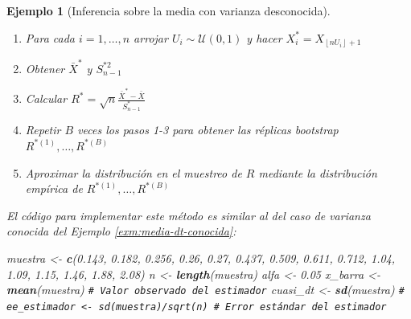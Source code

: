 \documentclass[
]{book}
\newenvironment{Shaded}{\begin{snugshade}}{\end{snugshade}}
\newcommand{\CommentTok}[1]{\textcolor[rgb]{0.56,0.35,0.01}{\textit{#1}}}
\newcommand{\FloatTok}[1]{\textcolor[rgb]{0.00,0.00,0.81}{#1}}
\newcommand{\FunctionTok}[1]{\textcolor[rgb]{0.13,0.29,0.53}{\textbf{#1}}}
\newcommand{\NormalTok}[1]{#1}
\newcommand{\OtherTok}[1]{\textcolor[rgb]{0.56,0.35,0.01}{#1}}
\theoremstyle{break}
\newtheorem{example}{Ejemplo}[chapter]
\theoremstyle{nonumberplain}
\renewcommand{\CommentTok}[1]{\textcolor[rgb]{0.41,0.41,0.41}{\texttt{#1}}}
\begin{document}
\begin{example}[Inferencia sobre la media con varianza desconocida]
\begin{enumerate}
\def\labelenumi{\arabic{enumi}.}
\item
  Para cada \(i=1,\ldots ,n\) arrojar \(U_i\sim \mathcal{U}\left( 0,1 \right)\) y
  hacer \(X_i^{\ast}=X_{\left\lfloor nU_i\right\rfloor +1}\)
\item
  Obtener \(\bar{X}^{\ast}\) y \(S_{n-1}^{\ast 2}\)
\item
  Calcular
  \(R^{\ast}=\sqrt{n}\frac{\bar{X}^{\ast}-\bar{X}}{
  S_{n-1}^{\ast}}\)
\item
  Repetir \(B\) veces los pasos 1-3 para obtener las réplicas bootstrap
  \(R^{\ast (1)}, \ldots, R^{\ast (B)}\)
\item
  Aproximar la distribución en el muestreo de \(R\) mediante la
  distribución empírica de \(R^{\ast (1)}, \ldots, R^{\ast (B)}\)
\end{enumerate}

El código para implementar este método es similar al del caso de varianza conocida
del Ejemplo \ref{exm:media-dt-conocida}:

\begin{Shaded}
\begin{Highlighting}[]
\NormalTok{muestra }\OtherTok{\textless{}{-}} \FunctionTok{c}\NormalTok{(}\FloatTok{0.143}\NormalTok{, }\FloatTok{0.182}\NormalTok{, }\FloatTok{0.256}\NormalTok{, }\FloatTok{0.26}\NormalTok{, }\FloatTok{0.27}\NormalTok{, }\FloatTok{0.437}\NormalTok{, }\FloatTok{0.509}\NormalTok{, }
             \FloatTok{0.611}\NormalTok{, }\FloatTok{0.712}\NormalTok{, }\FloatTok{1.04}\NormalTok{, }\FloatTok{1.09}\NormalTok{, }\FloatTok{1.15}\NormalTok{, }\FloatTok{1.46}\NormalTok{, }\FloatTok{1.88}\NormalTok{, }\FloatTok{2.08}\NormalTok{)}
\NormalTok{n }\OtherTok{\textless{}{-}} \FunctionTok{length}\NormalTok{(muestra)}
\NormalTok{alfa }\OtherTok{\textless{}{-}} \FloatTok{0.05}
\NormalTok{x\_barra }\OtherTok{\textless{}{-}} \FunctionTok{mean}\NormalTok{(muestra) }\CommentTok{\# Valor observado del estimador}
\NormalTok{cuasi\_dt }\OtherTok{\textless{}{-}} \FunctionTok{sd}\NormalTok{(muestra)}
\CommentTok{\# ee\_estimador \textless{}{-} sd(muestra)/sqrt(n) \# Error estándar del estimador}


\end{Highlighting}
\end{Shaded}
\end{example}
\end{document}
